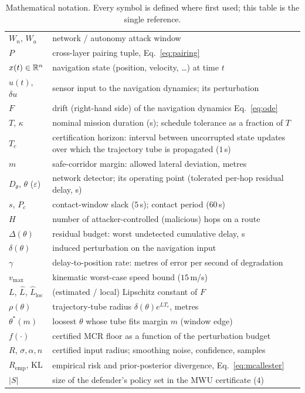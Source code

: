 \begin{table}[t]
\centering
\caption{Mathematical notation. Every symbol is defined where first used;
this table is the single reference.}
\label{tab:notation}
\small
\renewcommand{\arraystretch}{1.05}
\begin{tabularx}{\columnwidth}{@{}lX@{}}
\toprule
$W_n$, $W_a$ & network / autonomy attack window\\
$P$ & cross-layer pairing tuple, Eq.~\eqref{eq:pairing}\\
$x(t)\in\mathbb{R}^n$ & navigation state (position, velocity, \dots) at time $t$\\
$u(t)$, $\delta u$ & sensor input to the navigation dynamics; its perturbation\\
$F$ & drift (right-hand side) of the navigation dynamics Eq.~\eqref{eq:ode}\\
$T$, $\kappa$ & nominal mission duration (s); schedule tolerance as a
fraction of $T$\\
$T_c$ & certification horizon: interval between uncorrupted state updates
over which the trajectory tube is propagated ($1$\,s)\\
$m$ & safe-corridor margin: allowed lateral deviation, metres\\
$D_\theta$, $\theta$ ($\varepsilon$) & network detector; its operating point
(tolerated per-hop residual delay, s)\\
$s$, $P_{\!c}$ & contact-window slack ($5$\,s); contact period ($60$\,s)\\
$H$ & number of attacker-controlled (malicious) hops on a route\\
$\Delta(\theta)$ & residual budget: worst undetected cumulative delay, s\\
$\delta(\theta)$ & induced perturbation on the navigation input\\
$\gamma$ & delay-to-position rate: metres of error per second of degradation\\
$v_{\max}$ & kinematic worst-case speed bound ($15$\,m/s)\\
$L$, $\hat L$, $\hat L_{\mathrm{loc}}$ & (estimated / local) Lipschitz constant of $F$\\
$\rho(\theta)$ & trajectory-tube radius $\delta(\theta)e^{LT_c}$, metres\\
$\theta^{*}(m)$ & loosest $\theta$ whose tube fits margin $m$ (window edge)\\
$f(\cdot)$ & certified MCR floor as a function of the perturbation budget\\
$R$, $\sigma,\alpha,n$ & certified input radius; smoothing noise, confidence, samples\\
$R_{\mathrm{emp}}$, $\mathrm{KL}$ & empirical risk and prior-posterior divergence, Eq.~\eqref{eq:mcallester}\\
$|S|$ & size of the defender's policy set in the MWU certificate ($4$)\\
\bottomrule
\end{tabularx}
\end{table}



